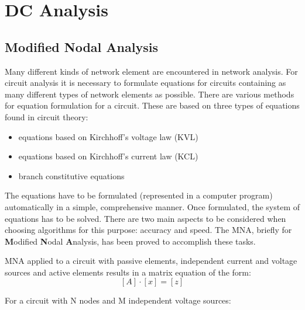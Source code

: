 %
%

\chapter{DC Analysis}

\section{Modified Nodal Analysis}
\label{sec:MNA}

Many different kinds of network element are encountered in network
analysis.  For circuit analysis it is necessary to formulate equations
for circuits containing as many different types of network elements as
possible.  There are various methods for equation formulation for a
circuit.  These are based on three types of equations found in circuit
theory:

\begin{itemize}
\item equations based on Kirchhoff's voltage law (KVL)
\item equations based on Kirchhoff's current law (KCL)
\item branch constitutive equations
\end{itemize}

The equations have to be formulated (represented in a computer
program) automatically in a simple, comprehensive manner.  Once
formulated, the system of equations has to be solved.  There are two
main aspects to be considered when choosing algorithms for this
purpose: accuracy and speed.  The MNA, briefly for \textbf{M}odified
\textbf{N}odal \textbf{A}nalysis, has been proved to accomplish these
tasks.

MNA applied to a circuit with passive elements, independent current
and voltage sources and active elements results in a matrix equation
of the form:
\begin{equation}
\left[A\right] \cdot \left[x\right] = \left[z\right]
\end{equation}

For a circuit with N nodes and M independent voltage sources:

